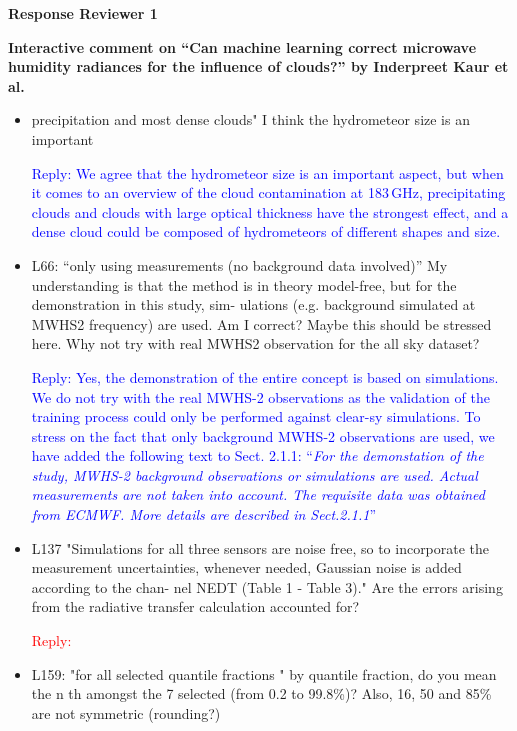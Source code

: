 \documentclass[11pt,a4paper,draft]{article}
\begin{document}
\textbf{Response Reviewer 1}
	
\textbf{	Interactive comment on ``Can machine learning
	correct microwave humidity radiances for the
	influence of clouds?'' by Inderpreet Kaur et al.}


\begin{itemize}

\item 	precipitation and most dense clouds" I think the hydrometeor size is an important
		
		
\textcolor{blue}{Reply: We agree that the hydrometeor size is an important aspect, but when it comes to an overview of the cloud contamination at 183\,GHz, precipitating clouds and clouds with large optical thickness have the strongest effect, and a dense cloud could be composed of hydrometeors of different shapes and size. }
		
		
\item	L66: ``only using measurements (no background data involved)'' My understanding is
		that the method is in theory model-free, but for the demonstration in this study, sim-
		ulations (e.g. background simulated at MWHS2 frequency) are used. Am I correct?
		Maybe this should be stressed here. Why not try with real MWHS2 observation for the
		all sky dataset?
		
\textcolor{blue}{Reply: Yes, the demonstration of the entire concept is based on simulations. We do not try with the real MWHS-2 observations as the validation of the training process could only be performed against clear-sy simulations. To stress on the fact that only background MWHS-2 observations are used, we have added the following text to Sect. 2.1.1:
``\textit{For the demonstation of the study, MWHS-2 background observations or simulations are used. Actual measurements are not taken into account. The requisite data was obtained from ECMWF. More details are described in Sect.2.1.1}''} 
		
		
\item
		L137 "Simulations for all three sensors are noise free, so to incorporate the measurement uncertainties, whenever needed, Gaussian noise is added according to the chan-
		nel NEDT (Table 1 - Table 3)." Are the errors arising from the radiative transfer calculation accounted for?
		
\textcolor{red}{Reply: } 
		
		
		
\item	
		L159: "for all selected quantile fractions " by quantile fraction, do you mean the n th
		amongst the 7 selected (from 0.2 to 99.8\%)? Also, 16, 50 and 85\% are not symmetric
		(rounding?)
		

\end{itemize}
\end{document}
